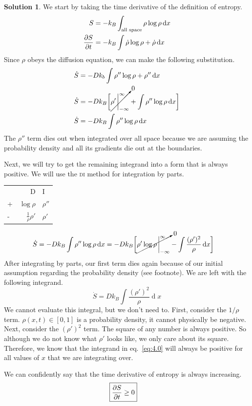 \documentclass[11pt]{article}
\renewcommand{\d}[1]{\ensuremath{\operatorname{d}\!{#1}}}
\theoremstyle{definition}
\newtheorem*{solution}{Solution}
\numberwithin{equation}{section}
\numberwithin{figure}{section}
\begin{document}
\begin{solution}
We start by taking the time derivative of the definition of entropy.
\begin{align}
S &= -k_B \int_{\text{all space}} \rho \log{\rho} \d{x}
\\
\pdv{S}{t} &= -k_B \int \dot{\rho} \log{\rho} + \dot{\rho} \d{x}
\end{align}
Since $\rho$ obeys the diffusion equation, we can make the following substitution.
\begin{align}
\dot{S} &= -Dk_b \int \rho'' \log{\rho} + \rho'' \d{x}
\\
\dot{S} &= -Dk_B \bigg[\cancelto{0}{\rho'\eval_{-\infty}^{\infty}} + \int  \rho'' \log{\rho} \d{x}\bigg]
\\
\dot{S} &= -Dk_B \int \rho'' \log{\rho} \d{x}
\end{align}
The $\rho''$ term dies out when integrated over all space because we are assuming the probability density and all its gradients die out at the boundaries.

Next, we will try to get the remaining integrand into a form that is always positive. We will use the \textsc{di} method for integration by parts.

\begin{center}
\begin{tabular}{lrl}
		& 	D		& 	I
\\
+		&		$\log{\rho}$		&		$\rho''$
\\
-		&		$\frac{1}{\rho}\rho'$		&		$\rho'$
\end{tabular}
\end{center}
\begin{align}
\dot{S} &= -Dk_B \int \rho'' \log{\rho} \d{x} = -Dk_B \bigg[ \cancelto{0}{\rho'\log{\rho}\eval_{-\infty}^{\infty}} - \int \frac{(\rho')^2}{\rho} \d{x}    \bigg]
\end{align}
After integrating by parts, our first term dies again because of our initial assumption regarding the probability density (see footnote). We are left with the following integrand.
\begin{equation}
\dot{S} = Dk_B \int \frac{(\rho')^2}{\rho} \d{x}\label{eq:4.0}
\end{equation}
We cannot evaluate this integral, but we don't need to. First, consider the $1/\rho$ term. $\rho(x,t) \in [0,1]$ is a probability density, it cannot physically be negative. Next, consider the $(\rho')^2$ term. The square of any number is always positive. So although we do not know what $\rho'$ looks like, we only care about its square. Therefore, we know that the integrand in eq.~\eqref{eq:4.0} will always be positive for all values of $x$ that we are integrating over.

We can confidently say that the time derivative of entropy is always increasing.
\begin{align}
\Aboxed{
\pdv{S}{t} &\geq 0}
\end{align}
\end{solution}
\end{document}
